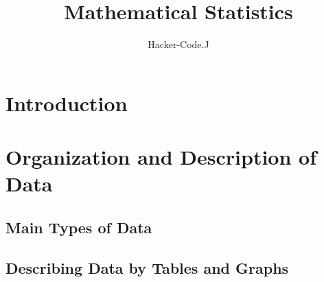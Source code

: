 \documentclass[12pt,a4paper]{article}
\author{Hacker-Code.J}
\title{\bf\Huge Mathematical Statistics}
\begin{document}
\maketitle
\tableofcontents
\newpage

\begin{tcolorbox}[colback=white]
	
\end{tcolorbox}

\section{Introduction}

\section{Organization and Description of Data}

\subsection{Main Types of Data}
%
\subsection{Describing Data by Tables and Graphs}
%
\end{document}
